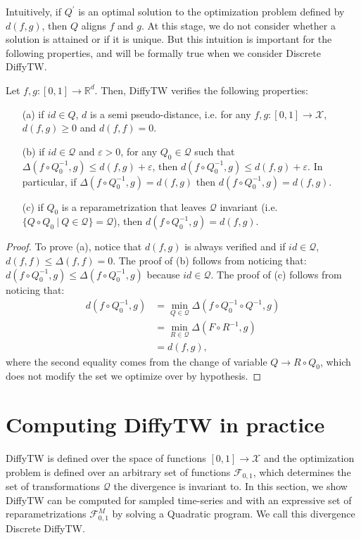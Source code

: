 Intuitively, if $Q^\prime$ is an optimal solution to the optimization problem defined by $d(f, g)$, then $Q$ aligns $f$ and $g$. At this stage, we do not consider whether a solution is attained or if it is unique. But this intuition is important for the following properties, and will be formally true when we consider Discrete DiffyTW.

\begin{proposition}\label{prop:diffytw-properties} Let $f, g:[0,1] \to\mathbb R^d$. Then, DiffyTW verifies the following properties:
\begin{enumerate}
\item[(a)]if $id \in Q$, $d$ is a semi pseudo-distance, i.e. for any $f, g: [0,1] \to\mathcal X$,  $d(f, g)\geq 0$ and $d(f, f)=0$.
\item[(b)]if $id \in \mathcal Q$ and $\varepsilon >0$, for any $Q_0\in\mathcal Q$ such that $\Delta(f\circ Q_0^{-1}, g) \leq d(f, g) + \varepsilon$, then $d(f \circ Q_0^{-1}, g) \leq d(f, g) + \varepsilon$. In particular, if $\Delta(f\circ Q_0^{-1}, g) = d(f,g)$ then $d(f\circ Q_0^{-1}, g)=d(f, g)$.
\item[(c)] if $Q_0$ is a reparametrization that leaves $\mathcal Q$ invariant (i.e. $\lbrace Q\circ Q_0 ~\vert~ Q\in \mathcal Q \rbrace = \mathcal Q$), then $d(f\circ Q_0^{-1}, g) = d(f, g)$.
\end{enumerate}
\end{proposition}
\begin{proof}

To prove (a), notice that $d(f,g)$ is always verified and if $id\in\mathcal Q$, $d(f,f) \leq \Delta(f, f)=0$.
The proof of (b) follows from noticing that: $d(f\circ Q_0^{-1}, g) \leq \Delta(f\circ Q_0^{-1}, g)$ because $id\in\mathcal Q$.
The proof of (c) follows from noticing that:
\begin{align}
d(f \circ Q_0^{-1}, g) &= \min_{Q\in\mathcal Q}\Delta(f\circ Q_0^{-1} \circ Q^{-1}, g)\\
& = \min_{R\in\mathcal Q} \Delta(F\circ R^{-1}, g)\\
& = d(f, g),
\end{align} where the second equality comes from the change of variable $Q \to R \circ Q_0$, which does not modify the set we optimize over by hypothesis.
\end{proof}


\section{Computing DiffyTW in practice}\label{sec:computing-diffytw}
DiffyTW is defined over the space of functions $[0,1] \to \mathcal X$ and the optimization problem is defined over an arbitrary set of functions $\mathcal F_{0,1}$, which determines the set of transformations $\mathcal Q$ the divergence is invariant to. In this section, we show DiffyTW can be computed for sampled time-series and with an expressive set of reparametrizations $\mathcal F_{0,1}^M$ by solving a Quadratic program. We call this divergence Discrete DiffyTW.


